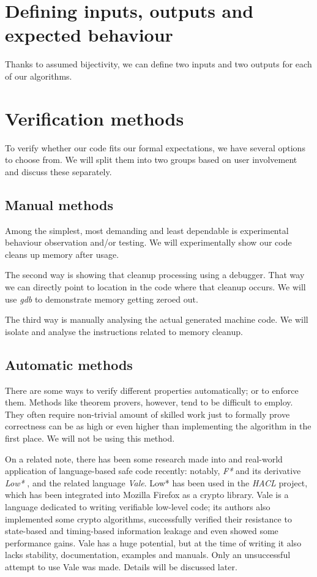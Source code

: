 \documentclass[a4paper,10pt,openright]{memoir}
\newcommand{\term}[1]{\textit{#1}}
\begin{document}
\section{Defining inputs, outputs and expected behaviour}

Thanks to assumed bijectivity, we can define two inputs and two outputs for each of our algorithms. 

\section{Verification methods}

To verify whether our code fits our formal expectations, we have 
several options to choose from. We will split them into two groups 
based on user involvement and discuss these separately.

\subsection{Manual methods}

Among the simplest, most demanding and least dependable is experimental 
behaviour observation and/or testing. We will experimentally show our 
code cleans up memory after usage.

The second way is showing that cleanup processing using a debugger. 
That way we can directly point to location in the code where that 
cleanup occurs. We will use \term{gdb} to demonstrate memory getting 
zeroed out.

The third way is manually analysing the actual generated machine code. 
We will isolate and analyse the instructions related to memory cleanup.

\subsection{Automatic methods}
\label{sec:verifmet}

There are some ways to verify different properties automatically; or to 
enforce them. Methods like theorem provers, however, tend to be 
difficult to employ. They often require non-trivial amount of skilled 
work just to formally prove correctness can be as high or even higher 
than implementing the algorithm in the first place.  We will not be using this method.

On a related note, there has been some research made into and 
real-world application of language-based safe code recently: notably, 
\term{F*} and its derivative \term{Low*} \cite{Low*}, and the related 
language \term{Vale}\cite{vale2017}. Low* has been used in the 
\term{HACL} project, which has been integrated into Mozilla Firefox as 
a crypto library. Vale is a language dedicated to writing verifiable 
low-level code; its authors also implemented some crypto algorithms, 
successfully verified their resistance to state-based and timing-based 
information leakage and even showed some performance gains. Vale has a 
huge potential, but at the time of writing it also lacks stability, 
documentation, examples and manuals. Only an unsuccessful attempt to 
use Vale was made. Details will be discussed later. 
\end{document}
